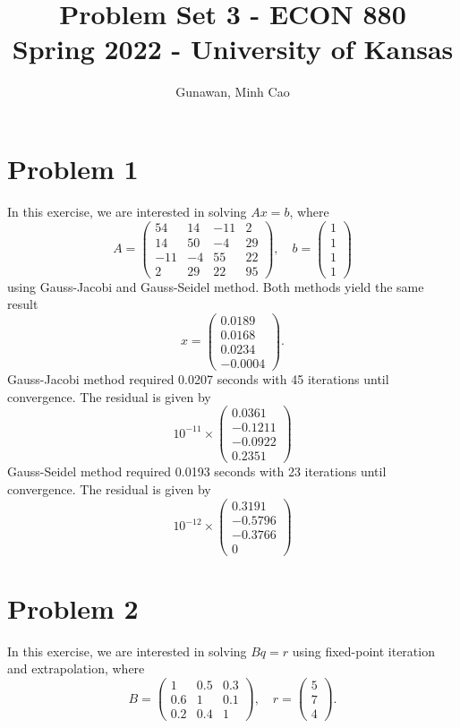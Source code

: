 \documentclass[11pt]{article}
\title{Problem Set 3 - ECON 880\\
	\small Spring 2022 - University of Kansas}
\author{Gunawan, Minh Cao}
\newcommand{\1}{\mathbbm{1}}
\begin{document}
\maketitle	

\section*{Problem 1}
In this exercise, we are interested in solving $Ax=b$, where
\[A = \begin{pmatrix}
	54 &14& -11& 2 \\ 14 &50& -4& 29 \\ -11 &-4 &55& 22 \\ 2& 29& 22& 95
\end{pmatrix}, \quad b = \begin{pmatrix}
	1\\1\\1\\1
\end{pmatrix} \]
using Gauss-Jacobi and Gauss-Seidel method. Both methods yield the same result
\[x = \begin{pmatrix}
	0.0189\\
	0.0168\\
	0.0234\\
	-0.0004
\end{pmatrix}.\]
Gauss-Jacobi method required 0.0207 seconds with 45 iterations until convergence. The residual is given by
\[
10^{-11} \times \begin{pmatrix}
	0.0361\\
	-0.1211\\
	-0.0922\\
	0.2351
\end{pmatrix}
\]
Gauss-Seidel method required 0.0193 seconds with 23 iterations until convergence. The residual is given by
\[10^{-12}\times \begin{pmatrix}
	0.3191\\
	-0.5796\\
	-0.3766\\
	0
\end{pmatrix}\]
   
\section*{Problem 2}
In this exercise, we are interested in solving $Bq=r$ using fixed-point iteration and extrapolation, where
\[B = \begin{pmatrix}
	1&0.5&0.3\\0.6&1&0.1\\0.2&0.4&1
\end{pmatrix}, \quad r = \begin{pmatrix}
	5\\7\\4
\end{pmatrix}. \]
\end{document}

